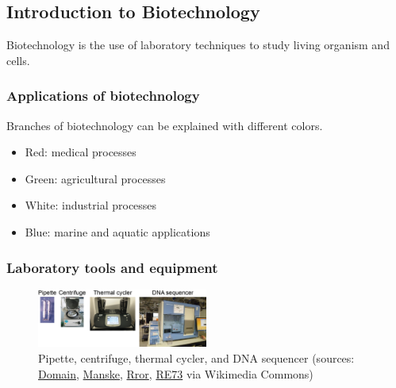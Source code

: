 
%

%
%
\subsection{Introduction to Biotechnology}
Biotechnology is the use of laboratory techniques to study living organism and cells. 

%
%
\subsubsection*{Applications of biotechnology}
Branches of biotechnology can be explained with different colors.
\begin{itemize}
\item Red: medical processes
\item Green: agricultural processes
\item White: industrial processes
\item Blue: marine and aquatic applications
\end{itemize}

%
%
\subsubsection*{Laboratory tools and equipment}

\begin{figure}[H]
  \centering
      \includegraphics[width=0.5\textwidth]{fig01/lab_equipment.png}
  \caption{Pipette, centrifuge, thermal cycler, and DNA sequencer \newline (sources:  \href{https://en.wikipedia.org/wiki/Pipette\#/media/File:Single_channel_rack.jpg}{Domain}, \href{https://commons.wikimedia.org/w/index.php?curid=494}{Manske},
\href{https://commons.wikimedia.org/w/index.php?curid=20189025}{Rror}, 
\href{https://commons.wikimedia.org/w/index.php?curid=18862968}{RE73} via Wikimedia Commons)}
\end{figure}
 
